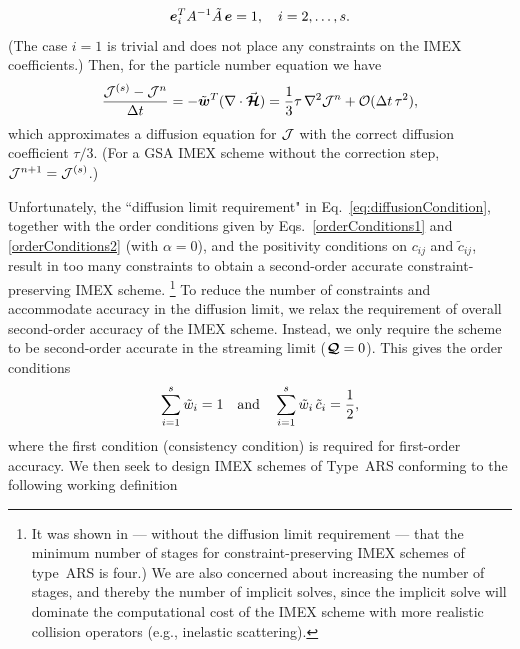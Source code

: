 \begin{equation}
  \boldsymbol{e}_{i}^{T}A^{-1}\tilde{A}\,\boldsymbol{e} = 1, \quad i=2,\ldots,s.
  \label{eq:diffusionCondition}
\end{equation}
(The case $i=1$ is trivial and does not place any constraints on the IMEX coefficients.)  
Then, for the particle number equation we have
\begin{equation}
  \frac{\mathcal{J}^{(s)}-\mathcal{J}^{n}}{\Delta t}
  =-\tilde{\boldsymbol{w}}^{T}(\nabla\cdot\vec{\boldsymbol{\mathcal{H}}})
  =\frac{1}{3}\tau\,\nabla^{2}\mathcal{J}^{n}+\mathcal{O}(\Delta t\,\tau^{2}), 
\end{equation}
which approximates a diffusion equation for $\mathcal{J}$ with the correct diffusion coefficient $\tau/3$.  
(For a GSA IMEX scheme without the correction step, $\mathcal{J}^{n+1}=\mathcal{J}^{(s)}$.)  

Unfortunately, the ``diffusion limit requirement" in Eq.~\eqref{eq:diffusionCondition}, together with the order conditions given by Eqs.~\eqref{orderConditions1} and \eqref{orderConditions2} (with $\alpha=0$), and the positivity conditions on $c_{ij}$ and $\tilde{c}_{ij}$, result in too many constraints to obtain a second-order accurate constraint-preserving IMEX scheme.
\footnote{It was shown in \cite{hu_etal_2018} --- without the diffusion limit requirement --- that the minimum number of stages for constraint-preserving IMEX schemes of type~ARS is four.)  
We are also concerned about increasing the number of stages, and thereby the number of implicit solves, since the implicit solve will dominate the computational cost of the IMEX scheme with more realistic collision operators (e.g., inelastic scattering).}  
To reduce the number of constraints and accommodate accuracy in the diffusion limit, we relax the requirement of overall second-order accuracy of the IMEX scheme.  
Instead, we only require the scheme to be second-order accurate in the streaming limit ($\boldsymbol{\mathcal{Q}}=0$).  
This gives the order conditions
\begin{equation}
  \sum_{i=1}^{s}\tilde{w}_{i}=1
  \quad\text{and}\quad
  \sum_{i=1}^{s}\tilde{w}_{i}\,\tilde{c}_{i}=\frac{1}{2},
  \label{eq:orderConditionsEx}
\end{equation}
where the first condition (consistency condition) is required for first-order accuracy.  
We then seek to design IMEX schemes of Type~ARS conforming to the following working definition
